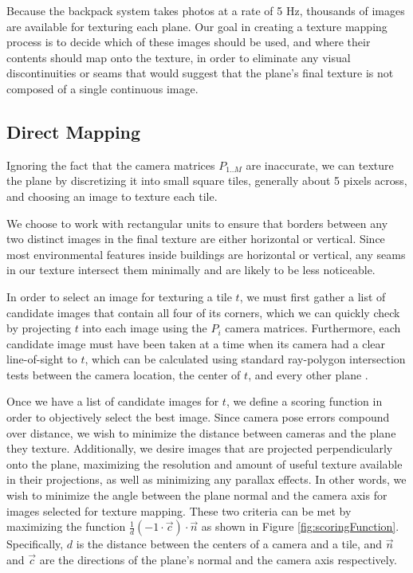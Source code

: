 \documentclass[10pt,twocolumn,letterpaper]{article}
\begin{document}
Because the backpack system takes photos at a rate of 5 Hz, thousands
of images are available for texturing each plane. Our goal in creating
a texture mapping process is to decide which of these images should be
used, and where their contents should map onto the texture, in order
to eliminate any visual discontinuities or seams that would suggest
that the plane's final texture is not composed of a single continuous
image.

\subsection{Direct Mapping}
\label{sec:directMapping}

Ignoring the fact that the camera matrices $P_{1..M}$ are inaccurate,
we can texture the plane by discretizing it into small square tiles,
generally about 5 pixels across, and choosing an image to texture each
tile.

We choose to work with rectangular units to ensure that borders
between any two distinct images in the final texture are either
horizontal or vertical. Since most environmental features inside
buildings are horizontal or vertical, any seams in our texture
intersect them minimally and are likely to be less noticeable.

In order to select an image for texturing a tile $t$, we must first
gather a list of candidate images that contain all four of its
corners, which we can quickly check by projecting $t$ into each image
using the $P_i$ camera matrices. Furthermore, each candidate image
must have been taken at a time when its camera had a clear
line-of-sight to $t$, which can be calculated using standard
ray-polygon intersection tests between the camera location, the center
of $t$, and every other plane \cite{rayintersection}.

Once we have a list of candidate images for $t$, we define a scoring
function in order to objectively select the best image. Since camera
pose errors compound over distance, we wish to minimize the distance
between cameras and the plane they texture. Additionally, we desire
images that are projected perpendicularly onto the plane, maximizing
the resolution and amount of useful texture available in their
projections, as well as minimizing any parallax effects. In other
words, we wish to minimize the angle between the plane normal and the
camera axis for images selected for texture mapping. These two
criteria can be met by maximizing the function $\frac{1}{d} (-1 \cdot
\vec{c}) \cdot \vec{n}$ as shown in Figure
\ref{fig:scoringFunction}. Specifically, $d$ is the distance between
the centers of a camera and a tile, and $\vec{n}$ and $\vec{c}$ are
the directions of the plane's normal and the camera axis respectively.
\end{document}
